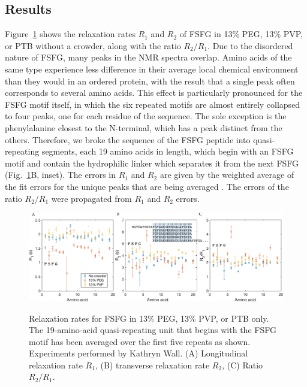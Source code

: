 \subsection{Results}

Figure~\ref{fig:NMR} shows the relaxation rates $R_1$ and $R_2$ of FSFG in 13\% PEG, 13\% PVP, or PTB without a crowder, along with the ratio $R_2/R_1$.  Due to the disordered nature of FSFG, many peaks in the NMR spectra overlap.  Amino acids of the same type experience less difference in their average local chemical environment than they would in an ordered protein, with the result that a single peak often corresponds to several amino acids.  This effect is particularly pronounced for the FSFG motif itself, in which the six repeated motifs are almost entirely collapsed to four peaks, one for each residue of the sequence.  The sole exception is the phenylalanine closest to the N-terminal, which has a peak distinct from the others.  Therefore, we broke the sequence of the FSFG peptide into quasi-repeating segments, each 19 amino acids in length, which begin with an FSFG motif and contain the hydrophilic linker which separates it from the next FSFG (Fig.~\ref{fig:NMR}B, inset).  The errors in $R_1$ and $R_2$ are given by the weighted average of the fit errors for the unique peaks that are being averaged \cite{taylor97}.  The errors of the ratio $R_2/R_1$ were propagated from $R_1$ and $R_2$ errors.

\begin{figure}[t!]
\caption[Relaxation times of FSFG in crowded conditions.]{Relaxation rates for FSFG in 13\% PEG, 13\% PVP, or PTB only.  The 19-amino-acid quasi-repeating unit that begins with the FSFG motif has been averaged over the first five repeats as shown.  Experiments performed by Kathryn Wall.  (A) Longitudinal relaxation rate $R_1$, (B) transverse relaxation rate $R_2$, (C) Ratio $R_2/R_1$.}
\centering
\includegraphics[width=\textwidth]{figs/ch05/NMR.pdf}
\label{fig:NMR}
\end{figure}

